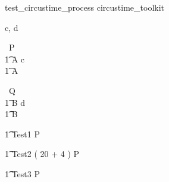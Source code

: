 
\begin{zsection}
   \SECTION test\_circustime\_process \parents circustime\_toolkit
\end{zsection}

\begin{circus}
   \circchannel c, d \\
\end{circus}


\begin{circus}
    \circprocess\ P \circdef  \circbegin  \\
    \t1 A \circdef c \then \Skip \\
    \t1 \circspot A \\
    \circend
\end{circus}



\begin{circus}
    \circprocess\ Q \circdef  \circbegin  \\
    \t1 B \circdef d \then \Skip \\
    \t1 \circspot B \\
    \circend
\end{circus}




\begin{circus}
   \t1 Test1  \circstartby P  \\
\end{circus}


\begin{circus}
   \t1 Test2 \circdef  ( 20 + 4 )  \circstartby P  \\
\end{circus}



\begin{circus}
   \t1 Test3 \circdef  P   \\
\end{circus}

